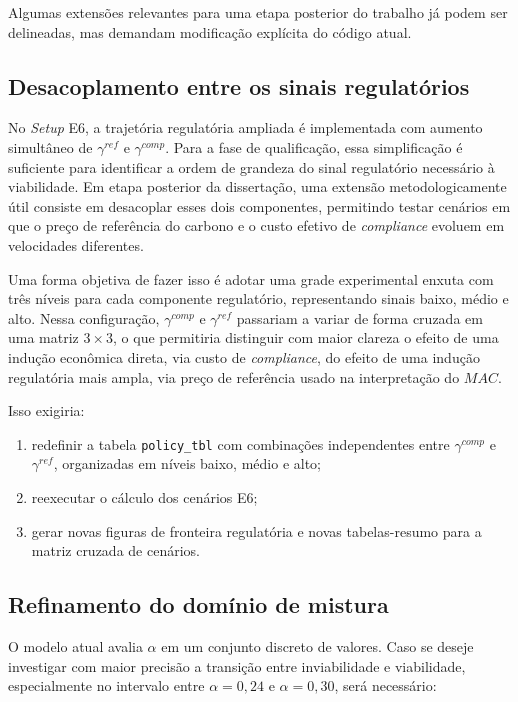 Algumas extensões relevantes para uma etapa posterior do trabalho já podem ser delineadas, mas demandam modificação explícita do código atual.

\subsection{Desacoplamento entre os sinais regulatórios}

No \emph{Setup} E6, a trajetória regulatória ampliada é implementada com aumento simultâneo de $\gamma^{ref}$ e $\gamma^{comp}$. Para a fase de qualificação, essa simplificação é suficiente para identificar a ordem de grandeza do sinal regulatório necessário à viabilidade. Em etapa posterior da dissertação, uma extensão metodologicamente útil consiste em desacoplar esses dois componentes, permitindo testar cenários em que o preço de referência do carbono e o custo efetivo de \emph{compliance} evoluem em velocidades diferentes.

Uma forma objetiva de fazer isso é adotar uma grade experimental enxuta com três níveis para cada componente regulatório, representando sinais baixo, médio e alto. Nessa configuração, $\gamma^{comp}$ e $\gamma^{ref}$ passariam a variar de forma cruzada em uma matriz $3 \times 3$, o que permitiria distinguir com maior clareza o efeito de uma indução econômica direta, via custo de \emph{compliance}, do efeito de uma indução regulatória mais ampla, via preço de referência usado na interpretação do $MAC$.

Isso exigiria:

\begin{enumerate}
    \item redefinir a tabela \texttt{policy\_tbl} com combinações independentes entre $\gamma^{comp}$ e $\gamma^{ref}$, organizadas em níveis baixo, médio e alto;
    \item reexecutar o cálculo dos cenários E6;
    \item gerar novas figuras de fronteira regulatória e novas tabelas-resumo para a matriz cruzada de cenários.
\end{enumerate}

\subsection{Refinamento do domínio de mistura}

O modelo atual avalia $\alpha$ em um conjunto discreto de valores. Caso se deseje investigar com maior precisão a transição entre inviabilidade e viabilidade, especialmente no intervalo entre $\alpha=0{,}24$ e $\alpha=0{,}30$, será necessário:

